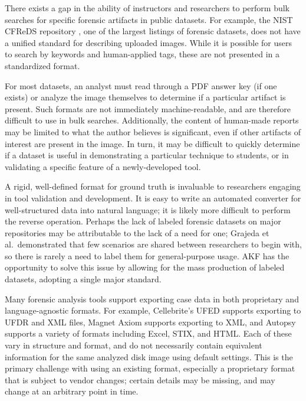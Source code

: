 \documentclass[letterpaper,12pt]{report}
\begin{document}
There exists a gap in the ability of instructors and researchers to
perform bulk searches for specific forensic artifacts in public
datasets. For example, the NIST CFReDS repository
\cite{nationalinstituteofstandardsandtechnologyCFReDSPortal}, one of
the largest listings of forensic datasets, does not have a unified
standard for describing uploaded images. While it is possible for users
to search by keywords and human-applied tags, these are not presented in
a standardized format.

For most datasets, an analyst must read through a PDF answer key (if one
exists) or analyze the image themselves to determine if a particular
artifact is present. Such formats are not immediately machine-readable,
and are therefore difficult to use in bulk searches. Additionally, the
content of human-made reports may be limited to what the author believes
is significant, even if other artifacts of interest are present in the
image. In turn, it may be difficult to quickly determine if a dataset is
useful in demonstrating a particular technique to students, or in
validating a specific feature of a newly-developed tool.

A rigid, well-defined format for ground truth is invaluable to
researchers engaging in tool validation and development. It is easy to
write an automated converter for well-structured data into natural
language; it is likely more difficult to perform the reverse operation.
Perhaps the lack of labeled forensic datasets on major repositories may
be attributable to the lack of a need for one; Grajeda et
al.~demonstrated that few scenarios are shared between researchers to
begin with, so there is rarely a need to label them for general-purpose
usage. AKF has the opportunity to solve this issue by allowing for the
mass production of labeled datasets, adopting a single major standard.

Many forensic analysis tools support exporting case data in both
proprietary and language-agnostic formats. For example, Cellebrite's
UFED supports exporting to UFDR and XML files, Magnet Axiom supports
exporting to XML, and Autopsy supports a variety of formats including
Excel, STIX, and HTML. Each of these vary in structure and format, and
do not necessarily contain equivalent information for the same analyzed
disk image using default settings. This is the primary challenge with
using an existing format, especially a proprietary format that is
subject to vendor changes; certain details may be missing, and may
change at an arbitrary point in time.
\end{document}
